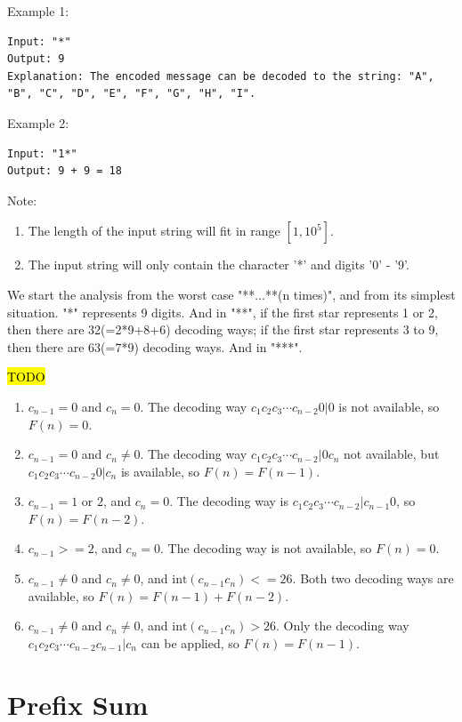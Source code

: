 \documentclass[11pt]{article}
\DeclareRobustCommand{\updated}[1]{{\sethlcolor{lightgray}\hl{#1}}}
\begin{document}
Example 1:
\begin{verbatim}
Input: "*"
Output: 9
Explanation: The encoded message can be decoded to the string: "A", "B", "C", "D", "E", "F", "G", "H", "I".	
\end{verbatim}

Example 2:
\begin{verbatim}
Input: "1*"
Output: 9 + 9 = 18	
\end{verbatim}

Note:
\begin{enumerate}
	\item The length of the input string will fit in range $[1, 10^5]$.
	\item The input string will only contain the character '*' and digits '0' - '9'.
\end{enumerate}

We start the analysis from the worst case "**...**(n times)", and from its simplest situation.
"*" represents 9 digits. 
And in "**", if the first star represents 1 or 2, then there are 32(=2*9+8+6) decoding ways; if the first star represents 3 to 9, then there are 63(=7*9) decoding ways. 
And in "***". 

\updated{TODO}
\begin{enumerate} 
	\item $c_{n-1}=0$ and $c_{n}=0$. The decoding way $c_1 c_2 c_3 \cdots c_{n-2}  0 | 0$ is not available, so $F(n)=0$.
	\item $c_{n-1}=0$ and $c_{n}\neq 0$. The decoding way $c_1 c_2 c_3 \cdots c_{n-2} | 0 c_{n}$ not available, but $c_1 c_2 c_3 \cdots c_{n-2}  0 | c_{n}$ is available, so $F(n)=F(n-1)$. 
	\item $c_{n-1}=1 \text{ or } 2$, and $c_{n}=0$. The decoding way is $c_1 c_2 c_3 \cdots c_{n-2}  | c_{n-1}  0$, so $F(n)=F(n-2)$.
	\item $c_{n-1}>=2$, and $c_{n}=0$. The decoding way is not available, so $F(n)=0$.
	\item $c_{n-1} \neq 0$ and $c_{n} \neq 0$, and $\text{int}(c_{n-1}c_{n})<=26$. Both two decoding ways are available, so $F(n)=F(n-1)+F(n-2)$.
	\item $c_{n-1} \neq 0$ and $c_{n} \neq 0$, and $\text{int}(c_{n-1}c_{n})>26$. Only the decoding way $c_1 c_2 c_3 \cdots c_{n-2} c_{n-1} | c_{n}$ can be applied, so $F(n)=F(n-1)$.
\end{enumerate}


\section{Prefix Sum}
\end{document}
